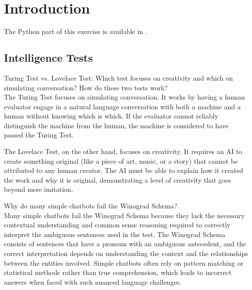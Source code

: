 \section{Introduction}

The Python part of this exercise is available in .

\subsection*{Intelligence Tests}

\begin{ejercicio}
    Turing Test vs. Lovelace Test: Which test focuses on creativity and which on simulating conversation? How do these two tests work?\\

    The Turing Test focuses on simulating conversation. It works by having a human evaluator engage in a natural language conversation with both a machine and a human without knowing which is which. If the evaluator cannot reliably distinguish the machine from the human, the machine is considered to have passed the Turing Test.

    The Lovelace Test, on the other hand, focuses on creativity. It requires an AI to create something original (like a piece of art, music, or a story) that cannot be attributed to any human creator. The AI must be able to explain how it created the work and why it is original, demonstrating a level of creativity that goes beyond mere imitation.
\end{ejercicio}

\begin{ejercicio}
    Why do many simple chatbots fail the Winograd Schema?\\

    Many simple chatbots fail the Winograd Schema because they lack the necessary contextual understanding and common sense reasoning required to correctly interpret the ambiguous sentences used in the test. The Winograd Schema consists of sentences that have a pronoun with an ambiguous antecedent, and the correct interpretation depends on understanding the context and the relationships between the entities involved. Simple chatbots often rely on pattern matching or statistical methods rather than true comprehension, which leads to incorrect answers when faced with such nuanced language challenges.
\end{ejercicio}


